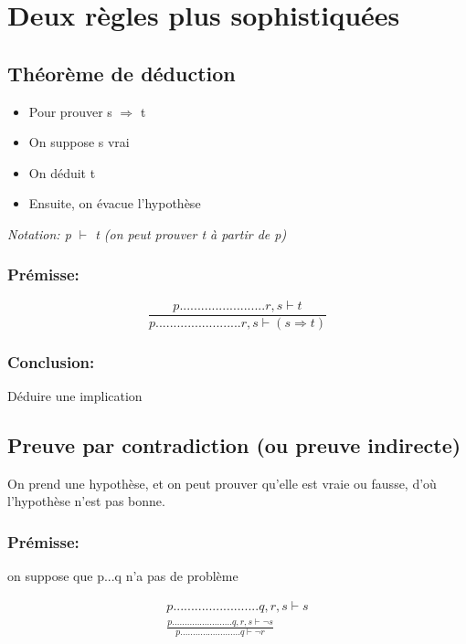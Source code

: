 
\section{Deux règles plus sophistiquées}

\subsection{Théorème de déduction}

\begin{itemize}
\item  Pour prouver s $\Rightarrow$ t
\item  On suppose s vrai
\item  On déduit t
\item  Ensuite, on évacue l'hypothèse
\end{itemize}


\textit{Notation: p $\vdash$ t (on peut prouver t à partir de p) }

\subsubsection{Prémisse:}

\begin{equation}
\frac{p........................r, s \vdash t} 
{p........................r, s \vdash (s \Rightarrow t)}
\end{equation}

\subsubsection{Conclusion:}

Déduire une implication

\subsection{Preuve par contradiction (ou preuve indirecte)}

On prend une hypothèse, et on peut prouver qu'elle est vraie ou fausse, d'où l'hypothèse n'est pas bonne.

\subsubsection{Prémisse:} 
on suppose que p...q n'a pas de problème

\begin{equation}
\begin{split}
p........................q, r, s \vdash s \\
\frac{p........................ q,r, s \vdash \lnot s}
{p........................ q \vdash \lnot r}
\end{split}
\end{equation}

